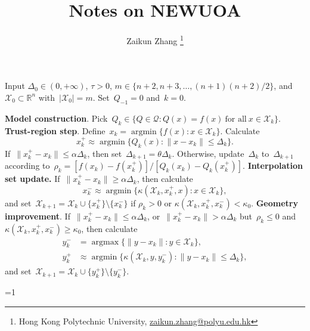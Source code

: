 \documentclass[11pt,a4paper,draft]{article}  %
\title{Notes on NEWUOA}
\date{\DTMnow}
\author{Zaikun Zhang
    \thanks{Hong Kong Polytechnic University, \url{zaikun.zhang@polyu.edu.hk}}
}
\newcommand{\bibfile}{\jobname.bib}  %
\newcommand{\iscite}{0}  %
\theoremstyle{definition}
\numberwithin{equation}{section}
\DeclareMathOperator*{\argmax}{argmax}
\DeclareMathOperator*{\argmin}{argmin}
\newcommand{\RR}{\mathbb{R}}
\newcommand{\Int}{\mathcal{X}}
\newcommand{\Qua}{\mathcal{Q}}
\begin{document}
\maketitle




\begin{algorithm}[htbp!]
    \caption{\label{alg:newuoa}}
    Input $\Delta_0\in (0,+\infty)$, $\tau>0$, $m\in \{n+2, n+3, \dots, (n+1)(n+2)/2\}$,
    and~$\Int_0\subset \RR^n$ with~$|\Int_0|=m$. Set~$Q_{-1} = 0$ and~$k=0$.
    \begin{algorithmic}[1]
        \State \textbf{Model construction}.
        Pick~$Q_k \in \{Q\in\Qua\mathrel{:} Q(x)=f(x)~\text{for all}~x\in\Int_k\}$.
        \State \textbf{Trust-region step}.
        Define~$x_k = \argmin\{f(x) \mathrel{:} x\in \Int_k\}$. Calculate
        \begin{equation}
         \label{eq:}
          x_k^+ \approx \argmin\{Q_k(x)\mathrel{:} \|x-x_k\|\le \Delta_k\}.
        \end{equation}
        If~$\|x_k^+-x_k\|\le \alpha\Delta_k$, then set~$\Delta_{k+1} = \theta \Delta_k$.
        Otherwise,
        update~$\Delta_k$ to~$\Delta_{k+1}$ according to~$\rho_k = [f(x_k) - f(x_k^+)]/[Q_k(x_k) - Q_k(x_k^+)]$.
        \State \textbf{Interpolation set update.}
        If~$\|x_k^{+}-x_k\| \ge \alpha\Delta_k$, then calculate
        \begin{equation}
            \label{eq:} x_k^{-} \approx \argmin\{\kappa(\Int_k, x_k^+, x) \mathrel{:} x \in
            \Int_k\},
        \end{equation}
        and set~$\Int_{k+1} = \Int_k\cup\{x_k^+\}\setminus\{x_k^{-}\}$
        if $\rho_k>0$ or $\kappa(\Int_k,x_k^+, x_k^-) < \kappa_0$.
        \State \textbf{Geometry improvement}.
        If~$\|x_k^{+}-x_k\|\le \alpha \Delta_k$, or~$\|x_k^{+}-x_k\| > \alpha \Delta_k$
        but~$\rho_k\le 0$ and $\kappa(\Int_k, x_k^{+},x_k^{-})\ge \kappa_0$, then calculate
          \begin{align}
              \label{eq:}
              y_k^{-} &= \argmax\{\|y-x_k\| \mathrel{:} y \in \Int_k\}, \\
              \label{eq:}
              y_k^{+} &\approx \argmin\{\kappa(\Int_k, y, y_k^{-}) \mathrel{:} \|y-x_k\|\le
              \Delta_k\},
          \end{align}
       and set~$\Int_{k+1} = \Int_k\cup\{y_k^{+}\}\setminus\{y_k^{-}\}$.
    \end{algorithmic}
\end{algorithm}


\ifnum\iscite=1
    \small
    
    
\fi

\end{document}

